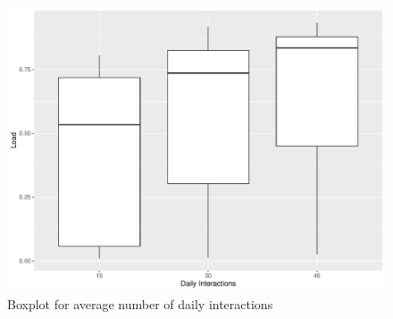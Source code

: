 \documentclass[12pt,a4paper]{article}
\begin{document}
\begin{appendices}
\begin{figure}[H]
	\includegraphics[width=\linewidth]{boxplot_num.daily.pdf}	
	\caption{Boxplot for average number of daily interactions}
	\label{fig:boxplot_num.daily}
\end{figure}








\end{appendices}


\newpage
\printbibliography
\end{document}
